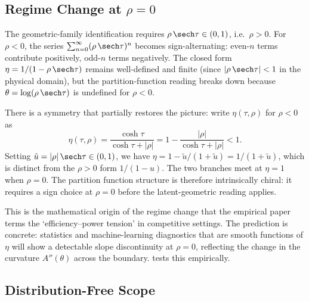 \subsection{Regime Change at \texorpdfstring{$\rho = 0$}{rho = 0}}
\label{sec:regime}

The geometric-family identification requires $\rho\,\sech\tau \in (0,1)$, i.e.\ $\rho > 0$.  For $\rho < 0$, the series $\sum_{n=0}^{\infty}(\rho\,\sech\tau)^{n}$ becomes sign-alternating: even-$n$ terms contribute positively, odd-$n$ terms negatively.  The closed form $\eta = 1/(1-\rho\,\sech\tau)$ remains well-defined and finite (since $|\rho\,\sech\tau| < 1$ in the physical domain), but the partition-function reading breaks down because $\theta = \log(\rho\,\sech\tau)$ is undefined for $\rho < 0$.

There is a symmetry that partially restores the picture: write $\eta(\tau,\rho)$ for $\rho < 0$ as
\[
  \eta(\tau,\rho)
  = \frac{\cosh\tau}{\cosh\tau + |\rho|}
  = 1 - \frac{|\rho|}{\cosh\tau + |\rho|} < 1.
\]
Setting $\tilde{u} = |\rho|\,\sech\tau \in (0,1)$, we have $\eta = 1 - \tilde{u}/(1+\tilde{u}) = 1/(1+\tilde{u})$, which is distinct from the $\rho > 0$ form $1/(1-u)$.  The two branches meet at $\eta = 1$ when $\rho = 0$.  The partition function structure is therefore intrinsically chiral: it requires a sign choice at $\rho = 0$ before the latent-geometric reading applies.

This is the mathematical origin of the regime change that the empirical paper terms the `efficiency--power tension' in competitive settings.  The prediction is concrete: statistics and machine-learning diagnostics that are smooth functions of $\eta$ will show a detectable slope discontinuity at $\rho = 0$, reflecting the change in the curvature $A''(\theta)$ across the boundary.   tests this empirically.

\subsection{Distribution-Free Scope}
\label{sec:distrib_free}

